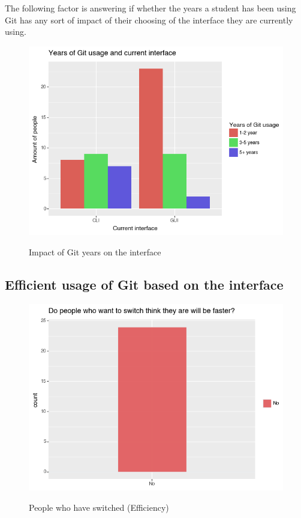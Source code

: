 \documentclass[]{report}
\begin{document}
		The following factor is answering if whether the years a student has been using Git has any sort of impact of their choosing of the interface they are currently using.
		\begin{figure}[H]
			\centering
			\includegraphics[width=0.75\linewidth]{YearsGitImpact}\\
			\caption{Impact of Git years on the interface}
			\label{fig: 8}
		\end{figure}
		
		\subsection{Efficient usage of Git based on the interface}
		\begin{figure}[H]
			\centering
			\includegraphics[width=0.75\linewidth]{EfficientSwitch}\\
			\caption{People who have switched (Efficiency)}
			\label{fig: 9}
		\end{figure}
		
\end{document}

